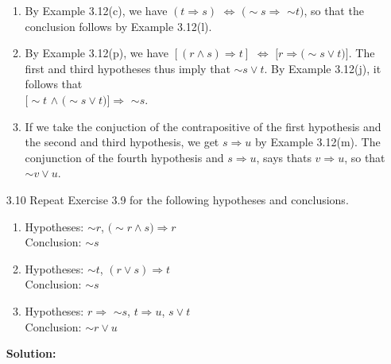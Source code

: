 \begin{enumerate}
      \begin{enumerate}
         \item By Example 3.12(c), we have $(t \Rightarrow s)$ $\Leftrightarrow$
               $(\sim$$s \Rightarrow$ $\sim$$t)$, so that the conclusion follows
               by Example 3.12(l).
         \item By Example 3.12(p), we have $[(r \land s) \Rightarrow t]$
               $\Leftrightarrow$ $[r \Rightarrow (\sim$$s \lor t)]$. The
               first and third hypotheses thus imply that $\sim$$s \lor t$.
               By Example 3.12(j), it follows that \\
               $[\sim$$t$ $\land$ $(\sim$$s \lor t)] \Rightarrow$ $\sim$$s$.
         \item If we take the conjuction of the contrapositive of the first
               hypothesis and the second and third hypothesis, we get
               $s \Rightarrow u$ by Example 3.12(m). The conjunction of the
               fourth hypothesis and $s \Rightarrow u$, says thats
               $v \Rightarrow u$, so that $\sim$$v \lor u$.
      \end{enumerate}
   \item[3.10] Repeat Exercise 3.9 for the following hypotheses and conclusions.
      \begin{enumerate}
         \item Hypotheses: $\sim$$r$, $(\sim$$r \land s) \Rightarrow r$ \\
               Conclusion: $\sim$$s$
         \item Hypotheses: $\sim$$t$, $(r \lor s) \Rightarrow t$ \\
               Conclusion: $\sim$$s$
         \item Hypotheses: $r \Rightarrow$ $\sim$$s$, $t \Rightarrow u$,
                           $s \lor t$ \\
               Conclusion: $\sim$$r \lor u$
      \end{enumerate}

      \textbf{Solution:}
      

\end{enumerate}
